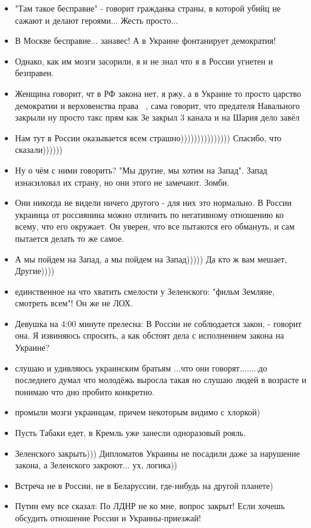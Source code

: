 \begin{itemize}
\item "Там такое бесправие" - говорит гражданка страны, в которой убийц не сажают и делают героями... Жесть просто...
\item В Москве бесправие... занавес! А в Украине фонтанирует демократия!
\item Однако, как им мозги засорили, я и не знал что я в России угнетен и безправен.
        \item Женщина говорит, чт в РФ закона нет, я ржу, а в Украине то просто царство демократии и верховенства права🤣🤣🤣, сама говорит, что предателя Навального закрыли ну просто такс прям как Зе закрыл 3 канала и на Шария дело завёл
        \item Нам тут в России оказывается всем страшно))))))))))))))) Спасибо, что сказали))))))
        \item Ну о чём с ними говорить? "Мы другие, мы хотим на Запад". Запад изнасиловал их страну, но они этого не замечают. Зомби.
        \item Они никогда не видели ничего другого - для них это нормально. В России украинца от россиянина можно отличить по негативному отношению ко всему, что его окружает. Он уверен, что все пытаются его обмануть, и сам пытается делать то же самое.
        \item А мы пойдем на Запад, а мы пойдем на Запад))))) Да кто ж вам мешает, Другие))))
        \item единственное на что хватить смелости у Зеленского: "фильм Земляне, смотреть всем"! Он же не ЛОХ.
        \item Девушка на 4:00 минуте прелесна: В России не соблюдается закон, - говорит она. Я извиняюсь спросить, а как обстоят дела с исполнением закона на Украине?
        \item слушаю и удивляюсь украинским братьям ...что они говорят........до последнего думал что молодёжь выросла  такая но слушаю людей в возрасте и понимаю  что дно пробито конкретно.
        \item промыли мозги украинцам, причем некоторым видимо с хлоркой)
\item Пусть Табаки едет, в Кремль уже занесли одноразовый рояль.
\item Зеленского закрыть))) Дипломатов Украины не посадили даже за нарушение закона, а Зеленского закроют... ух, логика))
\item Встреча не в России, не в Беларуссии, где-нибудь на другой планете)
\item Путин ему все сказал:  По ЛДНР не ко мне, вопрос закрыт! Если хочешь обсудить отношение России и Украины-приезжай!

\end{itemize}
